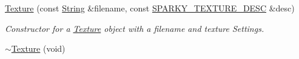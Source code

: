 \begin{DoxyCompactItemize}
\item 
\hyperlink{classsparky_1_1_texture_aa4d414b3e015de45973399d3765ea900}{Texture} (const \hyperlink{classsparky_1_1_string}{String} \&filename, const \hyperlink{structsparky_1_1_s_p_a_r_k_y___t_e_x_t_u_r_e___d_e_s_c}{S\+P\+A\+R\+K\+Y\+\_\+\+T\+E\+X\+T\+U\+R\+E\+\_\+\+D\+E\+SC} \&desc)
\begin{DoxyCompactList}\small\item\em Constructor for a \hyperlink{classsparky_1_1_texture}{Texture} object with a filename and texture Settings. \end{DoxyCompactList}\item 
\hyperlink{classsparky_1_1_texture_afcefbc71a6f666bb0ad3d418d88f1667}{$\sim$\+Texture} (void)\hypertarget{classsparky_1_1_texture_afcefbc71a6f666bb0ad3d418d88f1667}{}\label{classsparky_1_1_texture_afcefbc71a6f666bb0ad3d418d88f1667}


\end{DoxyCompactItemize}
